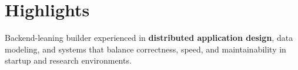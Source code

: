 \section{Highlights}

\begin{onecolentry}
    \begin{highlightsforbulletentries}

    \item Backend-leaning builder experienced in \textbf{distributed application design}, data modeling, and systems that balance correctness, speed, and maintainability in startup and research environments.


    \end{highlightsforbulletentries}
\end{onecolentry}